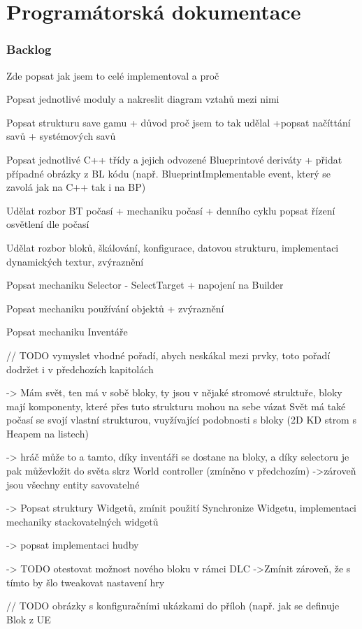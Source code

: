 
\chapter{Programátorská dokumentace}






\subsection{Backlog}

Zde popsat jak jsem to celé implementoval a proč

Popsat jednotlivé moduly a nakreslit diagram vztahů mezi nimi

Popsat strukturu save gamu + důvod proč jsem to tak udělal
+popsat načíttání savů + systémových savů


Popsat jednotlivé C++ třídy a jejich odvozené Blueprintové deriváty + přidat případné obrázky z BL kódu (např. BlueprintImplementable event, který se zavolá jak na C++ tak i na BP) 

Udělat rozbor BT počasí + mechaniku počasí + denního cyklu
popsat řízení osvětlení dle počasí

Udělat rozbor bloků, škálování, konfigurace, datovou strukturu, implementaci dynamických textur, zvýraznění

Popsat mechaniku Selector - SelectTarget + napojení na Builder

Popsat mechaniku používání objektů + zvýraznění

Popsat mechaniku Inventáře

// TODO vymyslet vhodné pořadí, abych neskákal mezi prvky, toto pořadí dodržet i v předchozích kapitolách

-> Mám svět, ten má v sobě bloky, ty jsou v nějaké stromové struktuře, bloky mají komponenty, které přes tuto strukturu mohou na sebe vázat
Svět má také počasí se svojí vlastní strukturou, vuyžívající podobnosti s bloky (2D KD strom s Heapem na listech)

-> hráč může to a tamto, díky inventáři se dostane na bloky, a díky selectoru je pak můževložit do světa skrz World controller (zmíněno v předchozím)
->zároveň jsou všechny entity savovatelné 


-> Popsat struktury Widgetů, zmínit použití Synchronize Widgetu, implementaci mechaniky stackovatelných widgetů

-> popsat implementaci hudby

-> TODO otestovat možnost nového bloku v rámci DLC
->Zmínit zároveň, že s tímto by šlo tweakovat nastavení hry



// TODO obrázky s konfiguračními ukázkami do příloh (např. jak se definuje Blok z UE


